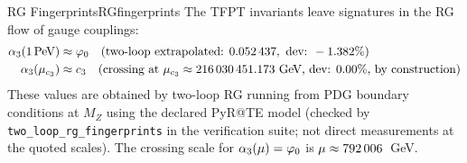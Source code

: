 \begin{corollary}{RG Fingerprints}{RGfingerprints}
The TFPT invariants leave signatures in the RG flow of gauge couplings:
\begin{align}
    \alpha_3(1\,\text{PeV}) &\approx \phiz \quad 
        \text{(two-loop extrapolated: } \num[round-mode=places,round-precision=6]{\TFPTalphaThreePeVNum}, \text{ dev: } -\num[round-mode=places,round-precision=3]{\TFPTalphaThreePeVRelDevPercent}\%\text{)}\\
    \alpha_3(\mu_{\cthree}) &\approx \cthree \quad 
        \text{(crossing at } \mu_{\cthree}\approx \num[round-mode=places,round-precision=3]{\TFPTmuCrosscThreeGeV}\ \text{GeV, dev: } 0.00\%\text{, by construction)}
\end{align}
These values are obtained by two-loop RG running from PDG boundary conditions at $M_Z$ using the declared PyR@TE model (checked by \texttt{two\_loop\_rg\_fingerprints} in the verification suite; not direct measurements at the quoted scales). The crossing scale for $\alpha_3(\mu)=\phiz$ is $\mu\approx \num[round-mode=places,round-precision=0]{\TFPTmuCrossVarphiZeroGeV}$~GeV.
\end{corollary}

